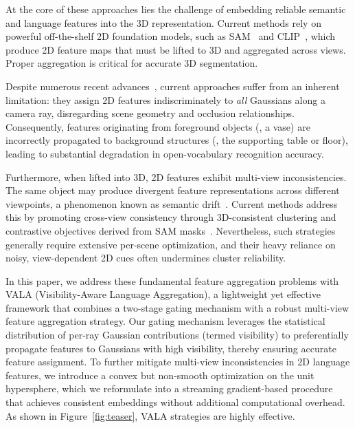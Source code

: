 At the core of these approaches lies the challenge of embedding reliable semantic and language features into the 3D representation. Current methods rely on powerful off-the-shelf 2D foundation models, such as SAM~\cite{kirillov2023sam} and CLIP~\cite{radford2021clip}, which produce 2D feature maps that must be lifted to 3D and aggregated across views. Proper aggregation is critical for accurate 3D segmentation.

Despite numerous recent advances~\cite{drsplat25,jiang2025votesplat,li2024instancegaussian,sun2025cags}, current approaches suffer from an inherent limitation: they assign 2D features indiscriminately to \textit{all} Gaussians along a camera ray, disregarding scene geometry and occlusion relationships. Consequently, features originating from foreground objects (\eg, a vase) are incorrectly propagated to background structures (\eg, the supporting table or floor), leading to substantial degradation in open-vocabulary recognition accuracy.

Furthermore, when lifted into 3D, 2D features exhibit multi-view inconsistencies. The same object may produce divergent feature representations across different viewpoints, a phenomenon known as semantic drift~\cite{kerr2023lerf}. Current methods address this by promoting cross-view consistency through 3D-consistent clustering and contrastive objectives derived from SAM masks~\cite{wu2024opengaussian, liang2024supergseg, li2024instancegaussian, piekenbrinck2025opensplat3d}. Nevertheless, such strategies generally require extensive per-scene optimization, and their heavy reliance on noisy, view-dependent 2D cues often undermines cluster reliability.

In this paper, we address these fundamental feature aggregation problems with VALA (Visibility-Aware Language Aggregation), a lightweight yet effective framework that combines a two-stage gating mechanism with a robust multi-view feature aggregation strategy. Our gating mechanism leverages the statistical distribution of per-ray Gaussian contributions (termed visibility) to preferentially propagate features to Gaussians with high visibility, thereby ensuring accurate feature assignment. To further mitigate multi-view inconsistencies in 2D language features, we introduce a convex but non-smooth optimization on the unit hypersphere, which we reformulate into a streaming gradient-based procedure that achieves consistent embeddings without additional computational overhead. As shown in Figure~\ref{fig:teaser}, VALA strategies are highly effective.

